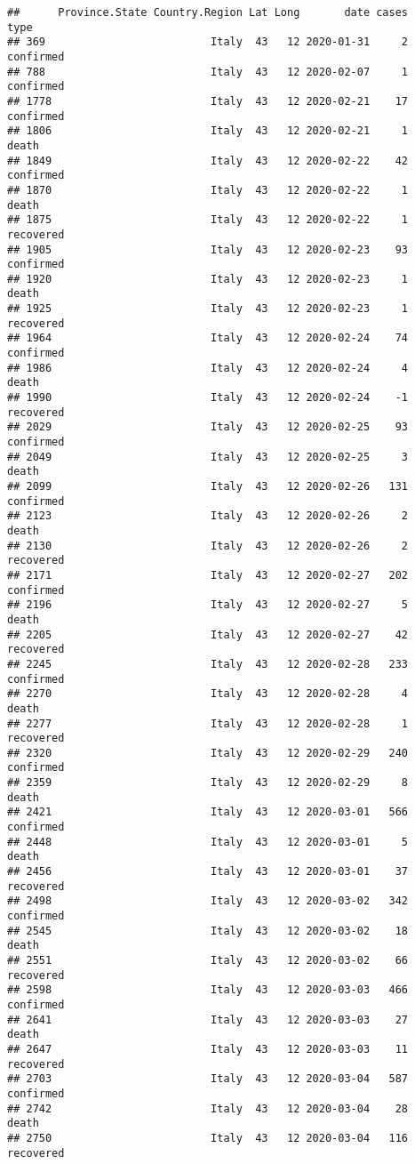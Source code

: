 \documentclass[
]{article}
\begin{document}
\begin{verbatim}
##      Province.State Country.Region Lat Long       date cases      type
## 369                          Italy  43   12 2020-01-31     2 confirmed
## 788                          Italy  43   12 2020-02-07     1 confirmed
## 1778                         Italy  43   12 2020-02-21    17 confirmed
## 1806                         Italy  43   12 2020-02-21     1     death
## 1849                         Italy  43   12 2020-02-22    42 confirmed
## 1870                         Italy  43   12 2020-02-22     1     death
## 1875                         Italy  43   12 2020-02-22     1 recovered
## 1905                         Italy  43   12 2020-02-23    93 confirmed
## 1920                         Italy  43   12 2020-02-23     1     death
## 1925                         Italy  43   12 2020-02-23     1 recovered
## 1964                         Italy  43   12 2020-02-24    74 confirmed
## 1986                         Italy  43   12 2020-02-24     4     death
## 1990                         Italy  43   12 2020-02-24    -1 recovered
## 2029                         Italy  43   12 2020-02-25    93 confirmed
## 2049                         Italy  43   12 2020-02-25     3     death
## 2099                         Italy  43   12 2020-02-26   131 confirmed
## 2123                         Italy  43   12 2020-02-26     2     death
## 2130                         Italy  43   12 2020-02-26     2 recovered
## 2171                         Italy  43   12 2020-02-27   202 confirmed
## 2196                         Italy  43   12 2020-02-27     5     death
## 2205                         Italy  43   12 2020-02-27    42 recovered
## 2245                         Italy  43   12 2020-02-28   233 confirmed
## 2270                         Italy  43   12 2020-02-28     4     death
## 2277                         Italy  43   12 2020-02-28     1 recovered
## 2320                         Italy  43   12 2020-02-29   240 confirmed
## 2359                         Italy  43   12 2020-02-29     8     death
## 2421                         Italy  43   12 2020-03-01   566 confirmed
## 2448                         Italy  43   12 2020-03-01     5     death
## 2456                         Italy  43   12 2020-03-01    37 recovered
## 2498                         Italy  43   12 2020-03-02   342 confirmed
## 2545                         Italy  43   12 2020-03-02    18     death
## 2551                         Italy  43   12 2020-03-02    66 recovered
## 2598                         Italy  43   12 2020-03-03   466 confirmed
## 2641                         Italy  43   12 2020-03-03    27     death
## 2647                         Italy  43   12 2020-03-03    11 recovered
## 2703                         Italy  43   12 2020-03-04   587 confirmed
## 2742                         Italy  43   12 2020-03-04    28     death
## 2750                         Italy  43   12 2020-03-04   116 recovered
\end{verbatim}
\end{document}
